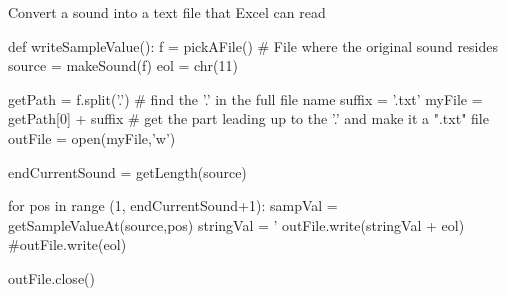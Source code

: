 \begin{recipe}{Convert a sound into a text file that Excel can read}
\begin{example}
def writeSampleValue():
    f = pickAFile()					# File where the original sound resides
    source = makeSound(f)
    eol = chr(11)

    getPath = f.split('.')                # find the '.' in the full file name
    suffix = '.txt'
    myFile = getPath[0] + suffix          # get the part leading up to the '.' and make it  a ".txt" file
    outFile = open(myFile,'w')
      
    endCurrentSound = getLength(source)
    
    for pos in range (1, endCurrentSound+1): 
        sampVal =  getSampleValueAt(source,pos) 
        stringVal = '%
        outFile.write(stringVal + eol)
        #outFile.write(eol)
    
    outFile.close()
\end{example}
\end{recipe}


